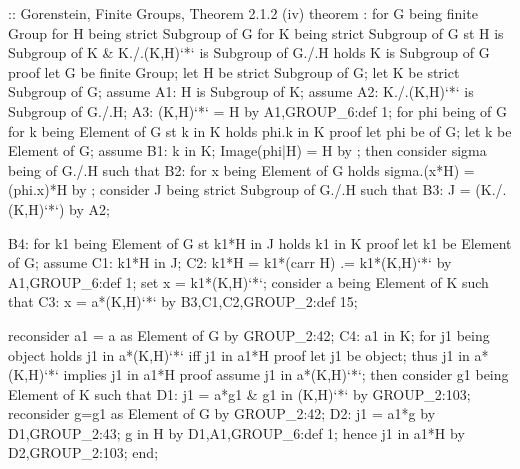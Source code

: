 \nwenddocs{}\endmoddef\nwstartdeflinemarkup{}\nwenddeflinemarkup
:: Gorenstein, Finite Groups, Theorem 2.1.2 (iv)
theorem :
  for G being finite Group
  for H being strict  Subgroup of G
  for K being strict Subgroup of G
  st H is Subgroup of K &
  K./.(K,H)`*` is  Subgroup of G./.H
  holds K is  Subgroup of G
proof
  let G be finite Group;
  let H be strict  Subgroup of G;
  let K be strict Subgroup of G;
  assume A1: H is Subgroup of K;
  assume A2: K./.(K,H)`*` is  Subgroup of G./.H;
  A3: (K,H)`*` = H by A1,GROUP_6:def 1;
  for phi being  of G
  for k being Element of G st k in K
  holds phi.k in K
  proof
    let phi be  of G;
    let k be Element of G;
    assume B1: k in K;
    Image(phi|H) = H by ;
    then consider sigma being  of G./.H such that
    B2: for x being Element of G holds sigma.(x*H) = (phi.x)*H
    by ;
    consider J being strict  Subgroup of G./.H such that
    B3: J = (K./.(K,H)`*`) by A2;

    B4: for k1 being Element of G st k1*H in J holds k1 in K
    proof
      let k1 be Element of G;
      assume C1: k1*H in J;
      C2: k1*H = k1*(carr H)
              .= k1*(K,H)`*` by A1,GROUP_6:def 1;
      set x = k1*(K,H)`*`;
      consider a being Element of K such that
      C3: x = a*(K,H)`*` by B3,C1,C2,GROUP_2:def 15;

      reconsider a1 = a as Element of G by GROUP_2:42;
      C4: a1 in K;
      for j1 being object holds j1 in a*(K,H)`*` iff j1 in a1*H
      proof
        let j1 be object;
        thus j1 in a*(K,H)`*` implies j1 in a1*H
        proof
          assume j1 in a*(K,H)`*`;
          then consider g1 being Element of K such that
          D1: j1 = a*g1 & g1 in (K,H)`*` by GROUP_2:103;
          reconsider g=g1 as Element of G by GROUP_2:42;
          D2: j1 = a1*g by D1,GROUP_2:43;
          g in H by D1,A1,GROUP_6:def 1;
          hence j1 in a1*H by D2,GROUP_2:103;
        end;

